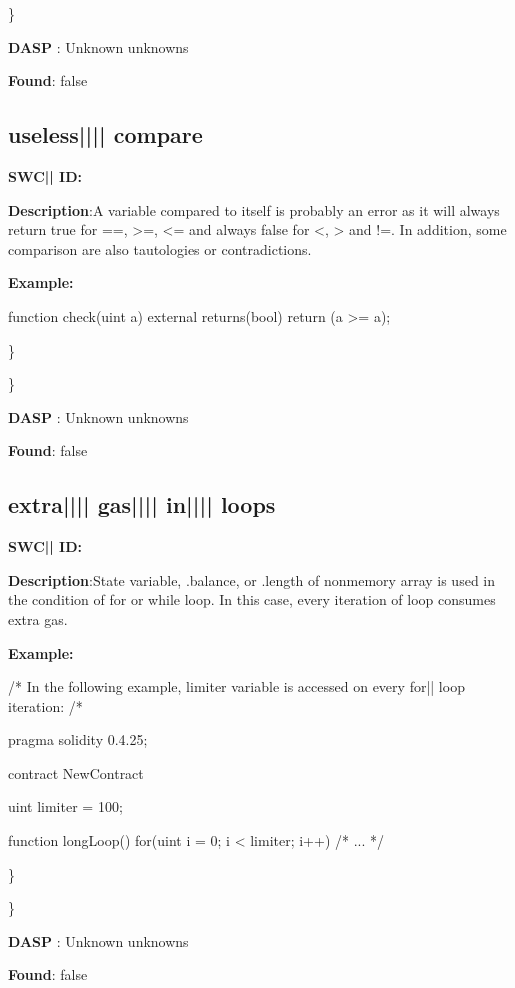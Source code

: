 \documentclass{article}
\begin{document}
\} 

\textbf{DASP} : Unknown unknowns

\textbf{Found}: false

\subsection{useless{||\textunderscore|| }compare} 
\textbf{SWC{|\textunderscore| }ID:} 

\textbf{Description}:A variable compared to itself is probably an error as it will always return true for ==, >=, <= and always false for <, > and !=. In addition, some comparison are also tautologies or contradictions.


\textbf{Example:} 
\begin{ffcode} 

function check(uint a) external returns(bool){
    return (a >= a);
}

\end{ffcode} 
\} 

\} 

\textbf{DASP} : Unknown unknowns

\textbf{Found}: false

\subsection{extra{||\textunderscore|| }gas{||\textunderscore|| }in{||\textunderscore|| }loops} 
\textbf{SWC{|\textunderscore| }ID:} 

\textbf{Description}:State variable, .balance, or .length of non{\textendash}memory array is used in the condition of for or while loop. In this case, every iteration of loop consumes extra gas.


\textbf{Example:} 
\begin{ffcode} 

/* In the following example, limiter variable is accessed on every for|\textendash| loop iteration: /* 

pragma solidity 0.4.25;

contract NewContract {
    uint limiter = 100;

    function longLoop() {
        for(uint i = 0; i < limiter; i++) {
            /* ... */
        }
    }
}

\end{ffcode} 
\} 

\} 

\textbf{DASP} : Unknown unknowns

\textbf{Found}: false
\end{document}
